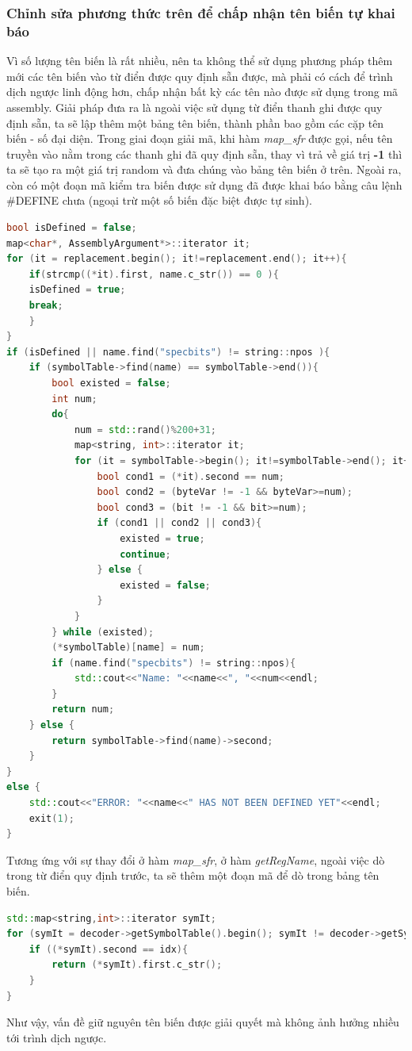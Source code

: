 
\subsubsection{Chỉnh sửa phương thức trên để chấp nhận tên biến tự khai báo}
Vì số lượng tên biến là rất nhiều, nên ta không thể sử dụng phương pháp thêm mới các tên biến vào từ điển được quy định sẵn được, mà phải có cách để trình dịch ngược linh động hơn, chấp nhận bất kỳ các tên nào được sử dụng trong mã assembly. Giải pháp đưa ra là ngoài việc sử dụng từ điển thanh ghi được quy định sẵn, ta sẽ lập thêm một bảng tên biến, thành phần bao gồm các cặp tên biến - số đại diện. Trong giai đoạn giải mã, khi hàm \textit{map\_sfr} được gọi, nếu tên truyền vào nằm trong các thanh ghi đã quy định sẵn, thay vì trả về giá trị \textbf{-1} thì ta sẽ tạo ra một giá trị random và đưa chúng vào bảng tên biến ở trên. Ngoài ra, còn có một đoạn mã kiểm tra biến được sử dụng đã được khai báo bằng câu lệnh \#DEFINE chưa (ngoại trừ một số biến đặc biệt được tự sinh). \\
\begin{lstlisting}[caption={Phần mã mới được bổ sung trong hàm map\_sfr},label={list:listmapsfrnew},language=c++]
bool isDefined = false;
map<char*, AssemblyArgument*>::iterator it;
for (it = replacement.begin(); it!=replacement.end(); it++){
	if(strcmp((*it).first, name.c_str()) == 0 ){
	isDefined = true;
	break;
	}
}
if (isDefined || name.find("specbits") != string::npos ){
	if (symbolTable->find(name) == symbolTable->end()){
		bool existed = false;
		int num;
		do{
			num = std::rand()%200+31;
			map<string, int>::iterator it;
			for (it = symbolTable->begin(); it!=symbolTable->end(); it++){
				bool cond1 = (*it).second == num;
				bool cond2 = (byteVar != -1 && byteVar>=num);
				bool cond3 = (bit != -1 && bit>=num);
				if (cond1 || cond2 || cond3){
					existed = true;
					continue;
				} else {
					existed = false;
				}	
			}
		} while (existed); 
		(*symbolTable)[name] = num;
		if (name.find("specbits") != string::npos){
			std::cout<<"Name: "<<name<<", "<<num<<endl;
		}	
		return num;
	} else {
		return symbolTable->find(name)->second;
	}
}
else {
	std::cout<<"ERROR: "<<name<<" HAS NOT BEEN DEFINED YET"<<endl;
	exit(1);
}
\end{lstlisting}
Tương ứng với sự thay đổi ở hàm \textit{map\_sfr},  ở hàm \textit{getRegName}, ngoài việc dò trong từ điển quy định trước, ta sẽ thêm một đoạn mã để dò trong bảng tên biến. 
\begin{lstlisting}[caption={Phần mã mới được bổ sung trong hàm getRegName},label={list:listgetregnamenew},language=c++]
std::map<string,int>::iterator symIt;
for (symIt = decoder->getSymbolTable().begin(); symIt != decoder->getSymbolTable().end(); symIt++){
	if ((*symIt).second == idx){
		return (*symIt).first.c_str();
	}
}
\end{lstlisting}
Như vậy, vấn đề giữ nguyên tên biến được giải quyết mà không ảnh hưởng nhiều tới trình dịch ngược.

